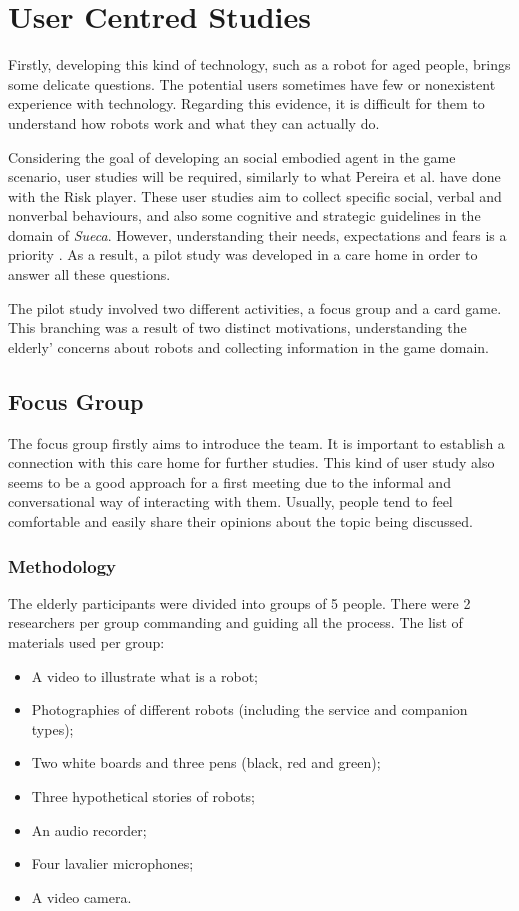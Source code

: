 \section{User Centred Studies} \label{sec:user-studies}

Firstly, developing this kind of technology, such as a robot for aged people, brings some delicate questions.
The potential users sometimes have few or nonexistent experience with technology.
Regarding this evidence, it is difficult for them to understand how robots work and what they can actually do.

Considering the goal of developing an social embodied agent in the game scenario, user studies will be required, similarly to what Pereira et al. have done with the Risk player.
These user studies aim to collect specific social, verbal and nonverbal behaviours, and also some cognitive and strategic guidelines in the domain of \emph{Sueca}.
However, understanding their needs, expectations and fears is a priority \cite{Lisboa}. As a result, a pilot study was developed in a care home in order to answer all these questions.

The pilot study involved two different
activities, a focus group and a card game.
This branching was a result of two distinct motivations, understanding the elderly' concerns about robots and collecting information in the game domain.





\subsection{Focus Group}
The focus group firstly aims to introduce the team.
It is important to establish a connection with this care home for further studies.
This kind of user study also seems to be a good approach for a first meeting due to the informal and conversational way of interacting with them.
Usually, people tend to feel comfortable and easily share their opinions about the topic being discussed.

\subsubsection{Methodology}
The elderly participants were divided into groups of 5 people.
There were 2 researchers per group commanding and guiding all the process.
The list of materials used per group:

\begin{itemize}
\item A video to illustrate what is a robot;
\item Photographies of different robots (including the service and companion types);
\item Two white boards and three pens (black, red and green);
\item Three hypothetical stories of robots;
\item An audio recorder;
\item Four lavalier microphones;
\item A video camera.
\end{itemize}

